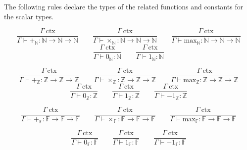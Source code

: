 \documentclass[11pt]{article}
\begin{document}
The following rules declare the types of the related
functions and constants for the scalar types.

\begin{equation}
	\frac{\Gamma\ \text{ctx}}
	{\Gamma \vdash +_{\mathbb{N}} : \mathbb{N} \to \mathbb{N} \to \mathbb{N}}
	\qquad
	\frac{\Gamma\ \text{ctx}}
	{\Gamma \vdash \times_{\mathbb{N}} : \mathbb{N} \to \mathbb{N} \to \mathbb{N}}
	\qquad
	\frac{\Gamma\ \text{ctx}}
	{\Gamma \vdash \text{max}_{\mathbb{N}} : \mathbb{N} \to \mathbb{N} \to \mathbb{N}}
\end{equation}
\begin{equation}
	\frac{\Gamma\ \text{ctx}}
	{\Gamma \vdash 0_{\mathbb{N}} : \mathbb{N}}
	\qquad
	\frac{\Gamma\ \text{ctx}}
	{\Gamma \vdash 1_{\mathbb{N}} : \mathbb{N}}
\end{equation}

\begin{equation}
	\frac{\Gamma\ \text{ctx}}
	{\Gamma \vdash +_{\mathbb{Z}} : \mathbb{Z} \to \mathbb{Z} \to \mathbb{Z}}
	\qquad
	\frac{\Gamma\ \text{ctx}}
	{\Gamma \vdash \times_{\mathbb{Z}} : \mathbb{Z} \to \mathbb{Z} \to \mathbb{Z}}
	\qquad
	\frac{\Gamma\ \text{ctx}}
	{\Gamma \vdash \text{max}_{\mathbb{Z}} : \mathbb{Z} \to \mathbb{Z} \to \mathbb{Z}}
\end{equation}
\begin{equation}
	\frac{\Gamma\ \text{ctx}}
	{\Gamma \vdash 0_{\mathbb{Z}} : \mathbb{Z}}
	\qquad
	\frac{\Gamma\ \text{ctx}}
	{\Gamma \vdash 1_{\mathbb{Z}} : \mathbb{Z}}
	\qquad
	\frac{\Gamma\ \text{ctx}}
	{\Gamma \vdash -1_{\mathbb{Z}} : \mathbb{Z}}
\end{equation}

\begin{equation}
	\frac{\Gamma\ \text{ctx}}
	{\Gamma \vdash +_{\mathbb{F}} : \mathbb{F} \to \mathbb{F} \to \mathbb{F}}
	\qquad
	\frac{\Gamma\ \text{ctx}}
	{\Gamma \vdash \times_{\mathbb{F}} : \mathbb{F} \to \mathbb{F} \to \mathbb{F}}
	\qquad
	\frac{\Gamma\ \text{ctx}}
	{\Gamma \vdash \text{max}_{\mathbb{F}} : \mathbb{F} \to \mathbb{F} \to \mathbb{F}}
\end{equation}

\begin{equation}
	\frac{\Gamma\ \text{ctx}}
	{\Gamma \vdash 0_{\mathbb{F}} : \mathbb{F}}
	\qquad
	\frac{\Gamma\ \text{ctx}}
	{\Gamma \vdash 1_{\mathbb{F}} : \mathbb{F}}
	\qquad
	\frac{\Gamma\ \text{ctx}}
	{\Gamma \vdash -1_{\mathbb{F}} : \mathbb{F}}
\end{equation}
\end{document}
